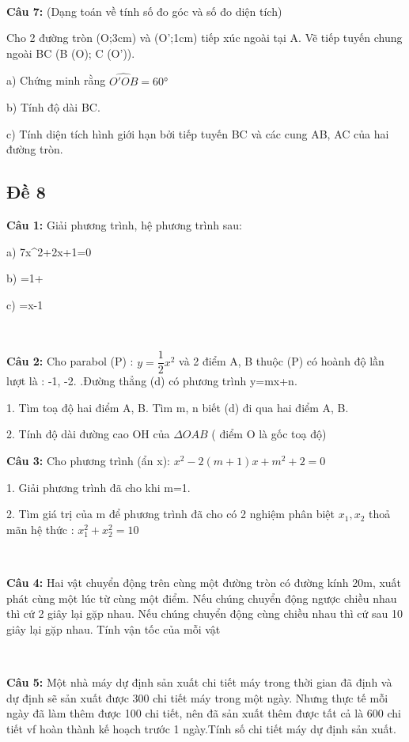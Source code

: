\documentclass[12pt]{article}
\begin{document}
\   

\textbf{Câu 7:} (Dạng toán về tính số đo góc và số đo diện tích) \par
Cho 2 đường tròn (O;3cm) và (O';1cm) tiếp xúc ngoài tại A. Vẽ tiếp tuyến chung ngoài BC (B \in (O); C \in (O')). \par
a) Chứng minh rằng $\widehat{O'OB} = \ang{60}$ \par
b) Tính độ dài BC. \par
c) Tính diện tích hình giới hạn bởi tiếp tuyến BC và các cung AB, AC của hai đường tròn.

\break

\subsection{Đề 8}

\textbf{Câu 1:} Giải phương trình, hệ phương trình sau:\par
a) 7x^2+2x+1=0 \par
b) =1+  \par
c) =x-1

\   

\textbf{Câu 2:} Cho parabol (P) : $y=\dfrac{1}{2}x^2$ và 2 điểm A, B thuộc (P) có hoành độ lần lượt là : -1, -2. .Đường thẳng (d) có phương trình y=mx+n.\par
1. Tìm toạ độ hai điểm A, B. Tìm m, n biết (d) đi qua hai điểm A, B. \par
2. Tính độ dài đường cao OH của $\Delta OAB$ ( điểm O là gốc toạ độ)

\textbf{Câu 3:} Cho phương trình (ẩn x): $x^2-2(m+1)x+m^2+2=0$  \par
1. Giải phương trình đã cho khi m=1. \par
2. Tìm giá trị của m để phương trình đã cho có 2 nghiệm phân biệt $x_1, x_2$ thoả mãn hệ thức : $x_1^2+x_2^2=10$

\   

\textbf{Câu 4:} Hai vật chuyển động trên cùng một đường tròn có đường kính 20m, xuất phát cùng một lúc từ cùng một điểm. Nếu chúng chuyển động ngược chiều nhau thì cứ 2 giây lại gặp nhau. Nếu chúng chuyển động cùng chiều nhau thì cứ sau 10 giây lại gặp nhau. Tính vận tốc của mỗi vật

\   

\textbf{Câu 5:} Một nhà máy dự định sản xuất chi tiết máy trong thời gian đã định và dự định sẽ sản xuất được 300 chi tiết máy trong một ngày. Nhưng thực tế mỗi ngày đã làm thêm được 100 chi tiết, nên đã sản xuất thêm được tất cả là 600 chi tiết vf hoàn thành kế hoạch trước 1 ngày.Tính số chi tiết máy dự định sản xuất.
\end{document}
